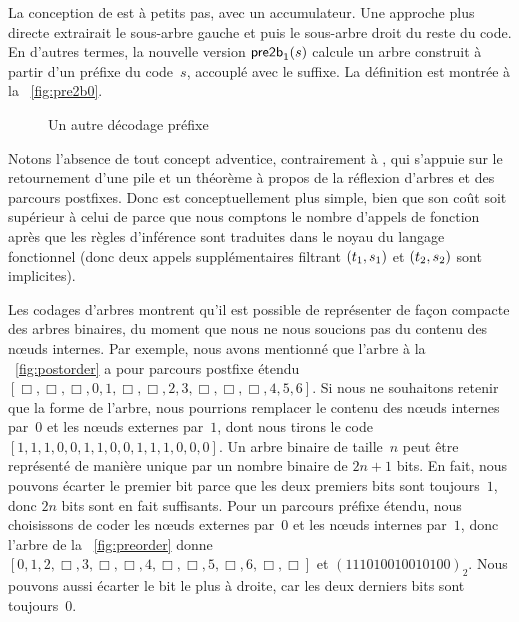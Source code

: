 La conception de  est à petits
pas, avec un accumulateur. Une approche plus directe extrairait le
sous-arbre gauche et puis le sous-arbre droit du reste du code. En
d'autres termes, la nouvelle version
\(\textsf{pre2b}_1(s)\) calcule un
arbre construit à partir d'un préfixe du code~\(s\), accouplé avec le
suffixe. La définition est montrée à la \fig~\vref{fig:pre2b0}.
\begin{figure}
\abovedisplayskip=0pt
\belowdisplayskip=0pt
\centering
{}
\caption{Un autre décodage préfixe}
\label{fig:pre2b0}
\end{figure}
Notons l'absence de tout concept adventice, contrairement à
, qui s'appuie sur le
retournement d'une pile et un théorème à
propos de la réflexion d'arbres et des parcours postfixes. Donc
 est
conceptuellement plus simple, bien que son coût soit supérieur à celui
de  parce que nous comptons le
nombre d'appels de fonction après que les règles
d'inférence sont traduites dans le noyau du
langage fonctionnel (donc deux appels supplémentaires filtrant
\(({t_1},{s_1})\) et \(({t_2},{s_2})\) sont implicites).

Les codages d'arbres montrent qu'il est possible de représenter de façon
compacte des arbres binaires, du moment que nous ne nous soucions pas du contenu
des nœuds internes. Par exemple, nous avons mentionné que l'arbre à la
\fig~\vref{fig:postorder} a pour parcours postfixe étendu \([\Box, \Box, \Box, 0, 1, \Box, \Box, 2, 3,
  \Box, \Box, \Box, 4, 5, 6]\). Si nous ne souhaitons retenir que la forme de
l'arbre, nous pourrions remplacer le contenu des nœuds internes par~\(0\) et les
nœuds externes par~\(1\), dont nous tirons le code
\([1,1,1,0,0,1,1,0,0,1,1,1,0,0,0]\). Un arbre binaire de taille~\(n\) peut être
représenté de manière unique par un nombre binaire de \(2n+1\) bits. En fait,
nous pouvons écarter le premier bit parce que les deux premiers bits sont
toujours~\(1\), donc \(2n\) bits sont en fait suffisants. Pour un parcours
préfixe étendu, nous choisissons de coder les nœuds externes par~\(0\) et les
nœuds internes par~\(1\), donc l'arbre de la \fig~\vref{fig:preorder} donne
\([0, 1, 2, \Box, 3, \Box, \Box, 4, \Box, \Box, 5, \Box, 6, \Box, \Box]\) et
\((111010010010100)_2\). Nous pouvons aussi écarter le bit le plus à droite, car
les deux derniers bits sont toujours~\(0\).

